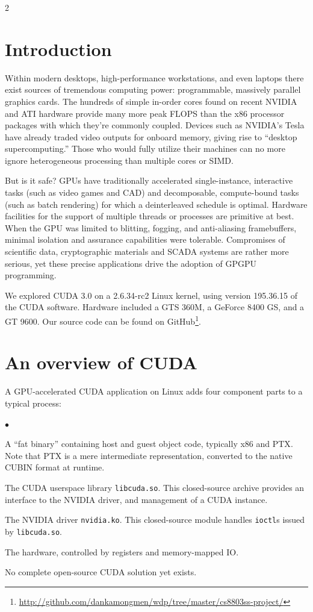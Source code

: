 \documentclass[letterpaper,10pt]{article}
\newcommand{\squishlist}{\begin{list}{$\bullet$}
  {\setlength{\itemsep}{0pt}
    \setlength{\parsep}{3pt}
    \setlength{\topsep}{3pt}
    \setlength{\partopsep}{0pt}
    \setlength{\leftmargin}{1.5em}
    \setlength{\labelwidth}{1em}
    \setlength{\labelsep}{0.5em}
  } }
\newcommand{\squishend}{\end{list}}
\begin{document}
\begin{multicols}{2}
\section{Introduction}
Within modern desktops, high-performance workstations, and even laptops there
exist sources of tremendous computing power: programmable, massively parallel graphics cards.
The hundreds of simple in-order cores found on recent NVIDIA and ATI hardware provide many more peak FLOPS than the x86 processor packages with
which they're commonly coupled.
Devices such as NVIDIA's Tesla\texttrademark{} have already traded video outputs for onboard memory, giving rise to ``desktop
supercomputing.'' Those who would fully utilize their machines can
no more ignore heterogeneous processing than multiple cores or SIMD\@.

But is it safe? GPUs have traditionally accelerated
single-instance, interactive tasks (such as video games and CAD) and
decomposable, compute-bound tasks (such as batch rendering) for which a
deinterleaved schedule is optimal. Hardware facilities for the support of
multiple threads or processes are primitive at best. When the GPU was limited to
blitting, fogging, and anti-aliasing framebuffers, minimal isolation and
assurance capabilities were tolerable. Compromises of scientific data,
cryptographic materials and SCADA systems are rather more serious, yet these
precise applications drive the adoption of GPGPU programming. 

We explored CUDA 3.0 on a 2.6.34-rc2 Linux kernel, using version 195.36.15
of the CUDA software. Hardware included a GTS 360M, a GeForce 8400 GS, and a
GT 9600. Our source code can be found on GitHub\footnote{\url{http://github.com/dankamongmen/wdp/tree/master/cs8803ss-project/}}.

\section{An overview of CUDA}
A GPU-accelerated CUDA application on Linux adds four component parts to
a typical process:
\squishlist
\item A ``fat binary'' containing host and guest object code, typically x86 and PTX\cite{ptxguide}.
Note that PTX is a mere intermediate representation, converted to the native
CUBIN format at runtime.
\item The CUDA userspace library \texttt{libcuda.so}. This closed-source archive
provides an interface to the NVIDIA driver, and management of a CUDA instance.
\item The NVIDIA driver \texttt{nvidia.ko}. This closed-source module handles
\texttt{ioctl}s issued by \texttt{libcuda.so}.
\item The hardware, controlled by registers and memory-mapped IO.
\squishend
No complete open-source CUDA solution yet exists.


\end{multicols}
\end{document}
